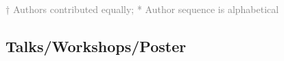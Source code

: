 \documentclass[hidelinks]{report}
\begin{document}
\textcolor{grey}{\footnotesize{† Authors contributed equally; * Author sequence is alphabetical}}






\subsection*{Talks/Workshops/Poster}
\end{document}
